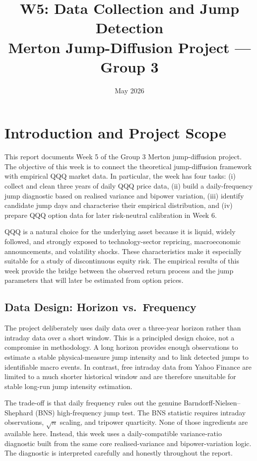 \documentclass[11pt,a4paper]{article}
\title{\textbf{W5: Data Collection and Jump Detection}\\[0.4em]
\large Merton Jump-Diffusion Project --- Group 3}
\date{May 2026}
\begin{document}
\maketitle
\tableofcontents
\newpage

\section{Introduction and Project Scope}

This report documents Week 5 of the Group 3 Merton jump-diffusion project. The objective of this week is to connect the theoretical jump-diffusion framework with empirical QQQ market data. In particular, the week has four tasks: (i) collect and clean three years of daily QQQ price data, (ii) build a daily-frequency jump diagnostic based on realised variance and bipower variation, (iii) identify candidate jump days and characterise their empirical distribution, and (iv) prepare QQQ option data for later risk-neutral calibration in Week 6.

QQQ is a natural choice for the underlying asset because it is liquid, widely followed, and strongly exposed to technology-sector repricing, macroeconomic announcements, and volatility shocks. These characteristics make it especially suitable for a study of discontinuous equity risk. The empirical results of this week provide the bridge between the observed return process and the jump parameters that will later be estimated from option prices.

\subsection{Data Design: Horizon vs.\ Frequency}

The project deliberately uses daily data over a three-year horizon rather than intraday data over a short window. This is a principled design choice, not a compromise in methodology. A long horizon provides enough observations to estimate a stable physical-measure jump intensity and to link detected jumps to identifiable macro events. In contrast, free intraday data from Yahoo Finance are limited to a much shorter historical window and are therefore unsuitable for stable long-run jump intensity estimation.

The trade-off is that daily frequency rules out the genuine Barndorff-Nielsen--Shephard (BNS) high-frequency jump test. The BNS statistic requires intraday observations, $\sqrt{n}$ scaling, and tripower quarticity. None of those ingredients are available here. Instead, this week uses a daily-compatible variance-ratio diagnostic built from the same core realised-variance and bipower-variation logic. The diagnostic is interpreted carefully and honestly throughout the report.
\end{document}
